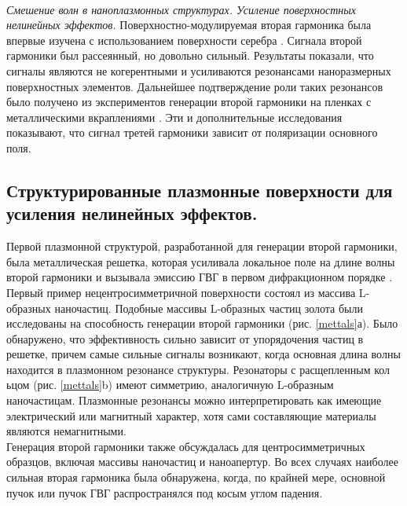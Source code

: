 \\
\hspace*{2mm}
\textit{Смешение волн в наноплазмонных структурах. Усиление поверхностных нелинейных эффектов.} Поверхностно-модулируемая вторая гармоника была впервые изучена с использованием поверхности серебра \cite{chen1981surface}. Сигнала второй гармоники был рассеянный, но довольно сильный. Результаты показали, что сигналы являются не когерентными и усиливаются резонансами наноразмерных поверхностных элементов. Дальнейшее подтверждение роли таких резонансов было получено из экспериментов генерации второй гармоники на пленках с металлическими вкраплениями \cite{wokaun1981surface}. Эти и дополнительные исследования показывают, что сигнал третей гармоники зависит от поляризации основного поля.

\subsection*{Структурированные плазмонные поверхности для усиления нелинейных эффектов.}
\hspace*{2mm}
Первой плазмонной структурой, разработанной для генерации второй гармоники, была металлическая решетка, которая усиливала локальное поле на длине волны второй гармоники и вызывала эмиссию ГВГ  в первом дифракционном порядке \cite{grosse2012nonlinear}. 
\\
Первый пример нецентросимметричной поверхности состоял из массива L-образных наночастиц. Подобные массивы L-образных частиц золота были исследованы на способность генерации второй гармоники (рис. \ref{mettals}а). Было обнаружено, что эффективность сильно зависит от упорядочения частиц в решетке, причем самые сильные сигналы возникают, когда основная длина волны находится в плазмонном резонансе структуры. Резонаторы с расщепленным кол
ьцом \cite{linden2012collective} (рис. \ref{mettals}b) имеют симметрию, аналогичную L-образным наночастицам. Плазмонные резонансы можно интерпретировать как имеющие электрический или магнитный характер, хотя сами составляющие материалы являются немагнитными. 
\\
\hspace*{2mm}
Генерация второй гармоники также обсуждалась для центросимметричных образцов, включая массивы наночастиц \cite{mcmahon2006second} и наноапертур. Во всех случаях наиболее сильная вторая гармоника была обнаружена, когда, по крайней мере, основной пучок или пучок ГВГ распространялся под косым углом падения.
\\
\hspace*{2mm}
